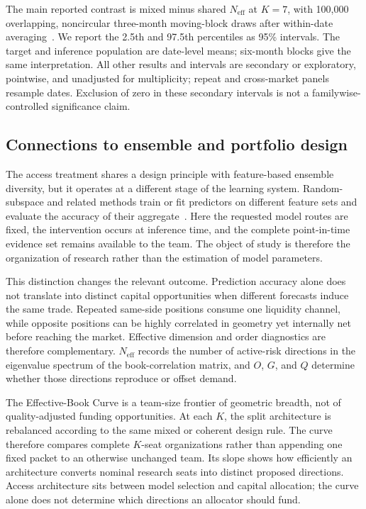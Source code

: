 \documentclass[sigconf]{acmart}
\begin{document}
The main reported contrast is mixed minus shared $N_{\mathrm{eff}}$ at $K=7$, with 100,000 overlapping, noncircular three-month moving-block draws after within-date averaging~\cite{kunsch1989bootstrap}. We report the 2.5th and 97.5th percentiles as 95\% intervals. The target and inference population are date-level means; six-month blocks give the same interpretation. All other results and intervals are secondary or exploratory, pointwise, and unadjusted for multiplicity; repeat and cross-market panels resample dates. Exclusion of zero in these secondary intervals is not a familywise-controlled significance claim.

\subsection{Connections to ensemble and portfolio design}
The access treatment shares a design principle with feature-based ensemble diversity, but it operates at a different stage of the learning system. Random-subspace and related methods train or fit predictors on different feature sets and evaluate the accuracy of their aggregate~\cite{brown2005diversity,ho1998random}. Here the requested model routes are fixed, the intervention occurs at inference time, and the complete point-in-time evidence set remains available to the team. The object of study is therefore the organization of research rather than the estimation of model parameters.

This distinction changes the relevant outcome. Prediction accuracy alone does not translate into distinct capital opportunities when different forecasts induce the same trade. Repeated same-side positions consume one liquidity channel, while opposite positions can be highly correlated in geometry yet internally net before reaching the market. Effective dimension and order diagnostics are therefore complementary. $N_{\mathrm{eff}}$ records the number of active-risk directions in the eigenvalue spectrum of the book-correlation matrix, and $O$, $G$, and $Q$ determine whether those directions reproduce or offset demand.

The Effective-Book Curve is a team-size frontier of geometric breadth, not of quality-adjusted funding opportunities. At each $K$, the split architecture is rebalanced according to the same mixed or coherent design rule. The curve therefore compares complete $K$-seat organizations rather than appending one fixed packet to an otherwise unchanged team. Its slope shows how efficiently an architecture converts nominal research seats into distinct proposed directions. Access architecture sits between model selection and capital allocation; the curve alone does not determine which directions an allocator should fund.
\end{document}
